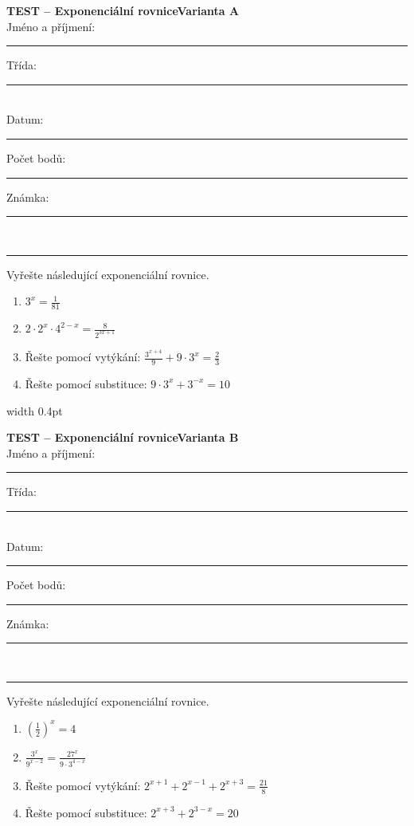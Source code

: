 \documentclass[a4paper,10pt,landscape]{article}
\newcommand{\TestTitle}{Exponenciální rovnice}
\newcommand{\TestHeader}[1]{%
    {\bfseries TEST -- \TestTitle}\hfill{\bfseries Varianta #1}\\[2mm]
    Jméno a příjmení: \rule{4.5cm}{0.4pt}\hfill Třída: \rule{1.5cm}{0.4pt}\\[2mm]
    Datum: \rule{2.4cm}{0.4pt}\hfill Počet bodů: \rule{1.4cm}{0.4pt}\hfill Známka: \rule{1.4cm}{0.4pt}\\[1mm]
    \hrule\vspace{3mm}
}
\newcommand{\AnswerSpace}[1]{\vspace{#1}}
\begin{document}
\noindent
\begin{minipage}[t]{0.48\textwidth}
    \small
    \TestHeader{A}

    Vyřešte následující exponenciální rovnice.
    \begin{enumerate}
        \item $\displaystyle 3^x=\frac{1}{81}$
        \AnswerSpace{18mm}
        \item $\displaystyle 2\cdot 2^x\cdot 4^{2-x}=\frac{8}{2^{3x+1}}$
        \AnswerSpace{24mm}
        \item Řešte pomocí vytýkání:
        $\displaystyle \frac{3^{x+4}}{9}+9\cdot 3^x=\frac{2}{3}$
        \AnswerSpace{30mm}
        \item Řešte pomocí substituce:
        $\displaystyle 9\cdot 3^x+3^{-x}=10$
        \AnswerSpace{34mm}
    \end{enumerate}
\end{minipage}%
\hfill\vrule width 0.4pt\hfill
\begin{minipage}[t]{0.48\textwidth}
    \small
    \TestHeader{B}

    Vyřešte následující exponenciální rovnice.
    \begin{enumerate}
        \item $\displaystyle \left(\frac{1}{2}\right)^x=4$
        \AnswerSpace{18mm}
        \item $\displaystyle \frac{3^x}{9^{x-2}}=\frac{27^x}{9\cdot 3^{4-x}}$
        \AnswerSpace{24mm}
        \item Řešte pomocí vytýkání:
        $\displaystyle 2^{x+1}+2^{x-1}+2^{x+3}=\frac{21}{8}$
        \AnswerSpace{30mm}
        \item Řešte pomocí substituce:
        $\displaystyle 2^{x+3}+2^{3-x}=20$
        \AnswerSpace{34mm}
    \end{enumerate}
\end{minipage}
\end{document}
